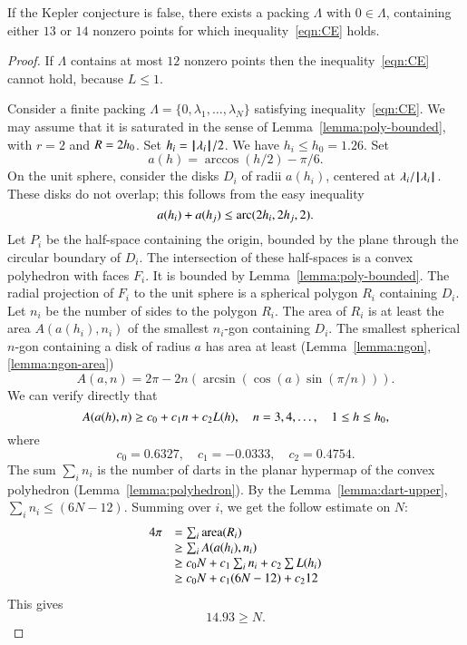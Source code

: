 \begin{lemma}\label{lemma:13-14}  
If the Kepler conjecture is false, there exists a packing $\Lambda$ with $0\in\Lambda$, containing either $13$ or $14$ nonzero points for which inequality~\ref{eqn:CE} holds.
\end{lemma}


\begin{proof} If $\Lambda$ contains at most $12$ nonzero points then
the inequality~\ref{eqn:CE} cannot hold, because $L\le 1$.

Consider a finite packing $\Lambda=\{0,\lambda_1,\ldots,\lambda_N\}$ satisfying inequality~\ref{eqn:CE}.   We may assume that it is saturated in the sense of Lemma~\ref{lemma:poly-bounded}, with $r=2$ and $R=2{h_0}$.  Set $h_i = {{\hskip0.1em|\hskip-0.15em|\hskip0.1em}\lambda_i{\hskip0.1em|\hskip-0.15em|\hskip0.1em}}/2$.  We have $h_i\le h_0=1.26$.  Set
$$
a(h) = \arccos(h/2) - \pi/6.
$$
On the unit sphere,  consider the disks $D_i$ of radii $a(h_i)$, centered at $\lambda_i/{{\hskip0.1em|\hskip-0.15em|\hskip0.1em}\lambda_i{\hskip0.1em|\hskip-0.15em|\hskip0.1em}}$.  These disks do not overlap; this follows from the easy inequality~\cite[cc:disks]{hales:2009:nonlinear} %
$$
a(h_i) + a(h_j) \le {\operatorname{arc}}(2h_i,2h_j,2).
$$
Let $P_i$ be the half-space containing the origin, bounded by the plane through the circular boundary of $D_i$.  The intersection of these half-spaces is a convex polyhedron with faces $F_i$.  It is bounded by Lemma~\ref{lemma:poly-bounded}.   The radial projection of $F_i$ to the unit sphere is a spherical polygon $R_i$ containing $D_i$.  Let $n_i$ be the number of sides to the polygon $R_i$.  The area of $R_i$ is at least the area $A(a(h_i),n_i)$ of the smallest $n_i$-gon containing $D_i$.  The smallest spherical $n$-gon containing a disk of radius $a$ has area at least (Lemma~\ref{lemma:ngon}, \ref{lemma:ngon-area})
$$
A(a,n) = 2\pi - 2 n (\arcsin(\cos(a)\sin(\pi/n))).
$$
We can verify directly that~\cite[cc:alin]{hales:2009:nonlinear} %
$$
A(a(h),n) \ge c_0 + c_1 n + c_2 L(h),\quad
n = 3,4,\ldots,\quad 1\le h\le {h_0},
$$
where
$$c_0 = 0.6327,\quad c_1 = -0.0333,\quad c_2 = 0.4754.$$
The sum $\sum_i n_i$ is the number of darts in the planar hypermap of
the convex polyhedron (Lemma~\ref{lemma:polyhedron}).  By the Lemma~\ref{lemma:dart-upper}, 
$\sum_i n_i \le (6N-12)$.
Summing over $i$,  we get the follow
estimate on $N$:
$$
\begin{array}{lll}
4\pi &= \sum_i{\operatorname{area}}(R_i)\\
     &\ge \sum_i A(a(h_i),n_i) \\
     &\ge c_0 N +c_1\sum_i n_i + c_2 \sum L(h_i)\\
     &\ge c_0 N +c_1 (6N-12) + c_2 12\\
\end{array}
$$
This gives
$$
14.93 \ge N.
$$
\end{proof} 


